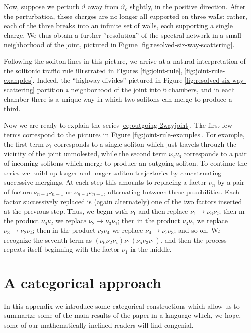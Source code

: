 \documentclass[11pt,a4paper]{article}
\begin{document}
Now, suppose we perturb $\vartheta$ away from $\vartheta_c$ slightly, in the positive direction.
After the perturbation, these charges are no longer all supported on three walls:  rather,
each of the three breaks into an infinite set of walls, each supporting a single charge.
We thus obtain a further ``resolution'' of the spectral network in a
small neighborhood of the joint, pictured in Figure \ref{fig:resolved-six-way-scattering}.

Following the soliton lines in this picture, we arrive at a natural interpretation of
the solitonic traffic rule illustrated in
Figures \ref{fig:joint-rule}, \ref{fig:joint-rule-examples}.
Indeed, the ``highway divides'' pictured in Figure \ref{fig:resolved-six-way-scattering}
partition a neighborhood of the joint into 6 chambers, and in each chamber there is a
unique way in which two solitons can merge to produce a third.

Now we are ready to explain the series \eqref{eq:outgoing-2wayjoint}.
The first few terms correspond to the pictures in Figure \ref{fig:joint-rule-examples}.
For example, the first term $\nu_1$ corresponds to a single soliton which just travels through the
vicinity of the joint unmolested, while the second term $\nu_2 \nu_6$ corresponds to a
pair of incoming solitons which merge to produce an outgoing soliton.
To continue the series we build up longer and longer soliton trajectories by concatenating
successive mergings. At each step this amounts to replacing a factor $\nu_n$
by a pair of factors $\nu_{n+1}\nu_{n-1}$ or $\nu_{n-1}\nu_{n+1}$, alternating
between these possibilities. Each factor successively replaced is
(again alternately) one of the two factors inserted at the previous step. Thus, we begin
with $\nu_1$ and then replace $\nu_1 \to \nu_6 \nu_2$;
then in the product $\nu_6 \nu_2$ we replace $\nu_2 \to \nu_3 \nu_1$;
then in the product $\nu_3 \nu_1$ we replace $\nu_3 \to \nu_2\nu_4$; then
in the product $\nu_2 \nu_4$ we replace $\nu_4 \to \nu_5\nu_3$; and so on.
We recognize the seventh term as $(\nu_6\nu_2\nu_4)\nu_1 (\nu_5 \nu_3\nu_1)$,
and then the process repeats itself beginning with the factor $\nu_1$ in the
middle.


\section{A categorical approach}\label{App:MathSummary}

In this appendix we introduce some categorical constructions
which allow us to summarize some of the main results of the
paper in a language which, we hope, some of our mathematically
inclined readers will find congenial.
\end{document}
